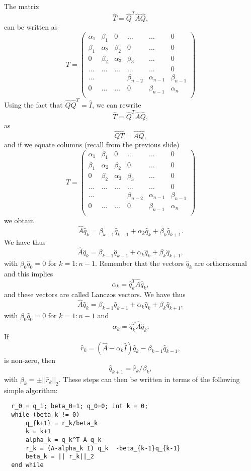 The matrix
\[
\hat{T}= \hat{Q}^{T}\hat{A}\hat{Q},
\]
can be  written as 
\[
    \hat{T} = \left(\begin{array}{cccccc}
                           \alpha_1& \beta_1 & 0 &\dots   & \dots &0 \\
                           \beta_1 & \alpha_2 & \beta_2 &0 &\dots &0 \\
                           0& \beta_2 & \alpha_3 & \beta_3 & \dots &0 \\
                           \dots& \dots   & \dots &\dots   &\dots & 0 \\
                           \dots&   &  &\beta_{n-2}  &\alpha_{n-1}& \beta_{n-1} \\
                           0&  \dots  &\dots  &0   &\beta_{n-1} & \alpha_{n} \\
                      \end{array} \right)
\]
Using the fact that $\hat{Q}\hat{Q}^T=\hat{I}$, 
we can rewrite 
\[
\hat{T}= \hat{Q}^{T}\hat{A}\hat{Q},
\]
as 
\[
\hat{Q}\hat{T}= \hat{A}\hat{Q},
\]
and if we equate columns (recall from the previous slide)
\[
    \hat{T} = \left(\begin{array}{cccccc}
                           \alpha_1& \beta_1 & 0 &\dots   & \dots &0 \\
                           \beta_1 & \alpha_2 & \beta_2 &0 &\dots &0 \\
                           0& \beta_2 & \alpha_3 & \beta_3 & \dots &0 \\
                           \dots& \dots   & \dots &\dots   &\dots & 0 \\
                           \dots&   &  &\beta_{n-2}  &\alpha_{n-1}& \beta_{n-1} \\
                           0&  \dots  &\dots  &0   &\beta_{n-1} & \alpha_{n} \\
                      \end{array} \right)
\]
we obtain
\[
\hat{A}\hat{q}_k=\beta_{k-1}\hat{q}_{k-1}+\alpha_k\hat{q}_k+\beta_k\hat{q}_{k+1}.
\]
We have thus
\[
\hat{A}\hat{q}_k=\beta_{k-1}\hat{q}_{k-1}+\alpha_k\hat{q}_k+\beta_k\hat{q}_{k+1},
\]
with $\beta_0\hat{q}_0=0$ for $k=1:n-1$.
Remember that the vectors $\hat{q}_k$  are orthornormal and this implies
\[
\alpha_k=\hat{q}_k^T\hat{A}\hat{q}_k,
\]
and these vectors are called Lanczos vectors.
We have thus
\[
\hat{A}\hat{q}_k=\beta_{k-1}\hat{q}_{k-1}+\alpha_k\hat{q}_k+\beta_k\hat{q}_{k+1},
\]
with $\beta_0\hat{q}_0=0$ for $k=1:n-1$ and 
\[
\alpha_k=\hat{q}_k^T\hat{A}\hat{q}_k.
\]
If 
\[
\hat{r}_k=(\hat{A}-\alpha_k\hat{I})\hat{q}_k-\beta_{k-1}\hat{q}_{k-1},
\]
is non-zero, then 
\[
\hat{q}_{k+1}=\hat{r}_{k}/\beta_k,
\]
with $\beta_k=\pm ||\hat{r}_{k}||_2$.  These steps can then be written in terms of the following simple algorithm:
\begin{lstlisting}
  r_0 = q_1; beta_0=1; q_0=0; int k = 0;
  while (beta_k != 0)
      q_{k+1} = r_k/beta_k
      k = k+1
      alpha_k = q_k^T A q_k
      r_k = (A-alpha_k I) q_k  -beta_{k-1}q_{k-1}
      beta_k = || r_k||_2
  end while
\end{lstlisting}

